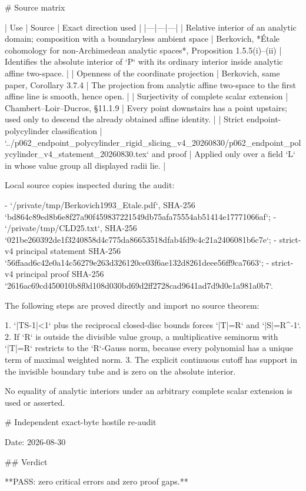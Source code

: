 # Source matrix

| Use | Source | Exact direction used |
|---|---|---|
| Relative interior of an analytic domain; composition with a boundaryless ambient space | Berkovich, *Étale cohomology for non-Archimedean analytic spaces*, Proposition 1.5.5(i)--(ii) | Identifies the absolute interior of `P` with its ordinary interior inside analytic affine two-space. |
| Openness of the coordinate projection | Berkovich, same paper, Corollary 3.7.4 | The projection from analytic affine two-space to the first affine line is smooth, hence open. |
| Surjectivity of complete scalar extension | Chambert--Loir--Ducros, §11.1.9 | Every point downstairs has a point upstairs; used only to descend the already obtained affine identity. |
| Strict endpoint-polycylinder classification | `../p062_endpoint_polycylinder_rigid_slicing_v4_20260830/p062_endpoint_polycylinder_v4_statement_20260830.tex` and proof | Applied only over a field `L` in whose value group all displayed radii lie. |

Local source copies inspected during the audit:

- `/private/tmp/Berkovich1993_Etale.pdf`, SHA-256
  `bd864c89ed8b6e8f27a90f459837221549db75afa75554ab51414e17771066af`;
- `/private/tmp/CLD25.txt`, SHA-256
  `021be260392de1f3240858d4c775da86653518dfab4fd9c4c21a2406081b6c7e`;
- strict-v4 principal statement SHA-256
  `56ffaad6c42e0a14c56279e263d326120ce03f6ae132d8261deee56ff9ca7663`;
- strict-v4 principal proof SHA-256
  `2616ac69cd450010b8f0d108d030bd69d2ff2728cad9641ad7d9d0e1a981a0b7`.

The following steps are proved directly and import no source theorem:

1. `|TS-1|<1` plus the reciprocal closed-disc bounds forces
   `|T|=R` and `|S|=R^{-1}`.
2. If `R` is outside the divisible value group, a multiplicative seminorm
   with `|T|=R` restricts to the `R`-Gauss norm, because every polynomial
   has a unique term of maximal weighted norm.
3. The explicit continuous cutoff has support in the invisible boundary
   tube and is zero on the absolute interior.

No equality of analytic interiors under an arbitrary complete scalar
extension is used or asserted.

# Independent exact-byte hostile re-audit

Date: 2026-08-30

## Verdict

**PASS: zero critical errors and zero proof gaps.**

